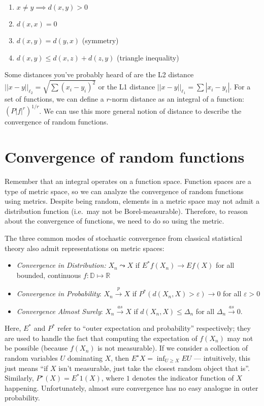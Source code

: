 \documentclass[
]{article}
\providecommand{\tightlist}{%
  \setlength{\itemsep}{0pt}\setlength{\parskip}{0pt}}
\begin{document}
\begin{enumerate}
	\item \(x\neq y \implies d(x,y) > 0\)
	\item \(d(x,x) = 0\)
	\item \(d(x,y) = d(y,x)\) (symmetry)
	\item \(d(x,y) \leq d(x,z) + d(z, y)\) (triangle inequality)
\end{enumerate}

Some distances you've probably heard of are the L2 distance
\(||x - y||_{\ell_2} = \sqrt{\sum{(x_i - y_i)^2}}\) or the L1 distance
\(||x-y||_{\ell_1} = \sum{|x_i - y_i|}\). For a set of functions, we can
define a \(r\)-norm distance as an integral of a function:
\((P|f|^r)^{1/r}\). We can use this more general notion of distance to
describe the convergence of random functions.

\section{Convergence of random
functions}\label{convergence-of-random-functions}

Remember that an integral operates on a function space. Function spaces
are a type of metric space, so we can analyze the convergence of random
functions using metrics. Despite being random, elements in a metric
space may not admit a distribution function (i.e.~may not be
Borel-measurable). Therefore, to reason about the convergence of
functions, we need to do so using the metric.

The three common modes of stochastic convergence from classical
statistical theory also admit representations on metric spaces:

\begin{itemize}
\tightlist
\item
  \emph{Convergence in Distribution:} \(X_n \leadsto X\) if
  \(E^* f(X_n) \rightarrow Ef(X)\) for all bounded, continuous
  \(f : \mathbb{D} \mapsto \mathbb{R}\)
\item
  \emph{Convergence in Probability}: \(X_n \overset{p}{\rightarrow}X\)
  if \(P^*(d(X_n, X) > \varepsilon) \rightarrow 0\) for all
  \(\varepsilon > 0\)
\item
  \emph{Convergence Almost Surely}: \(X_n \overset{as}{\rightarrow}X\)
  if \(d(X_n, X) \leq \Delta_n\) for all
  \(\Delta_n \overset{as}{\rightarrow} 0\).
\end{itemize}

Here, \(E^*\) and \(P^*\) refer to ``outer expectation and probability''
respectively; they are used to handle the fact that computing the
expectation of \(f(X_n)\) may not be possible (because \(f(X_n)\) is not
measurable). If we consider a collection of random variables \(U\)
dominating \(X\), then \(E^\star X = \inf_{U \geq X} EU\) ---
intuitively, this just means ``if \(X\) isn't measurable, just take the
closest random object that is''. Similarly, \(P^\star(X) = E^* 1(X)\),
where \(1\) denotes the indicator function of \(X\) happening.
Unfortunately, almost sure convergence has no easy analogue in outer
probability.
\end{document}
